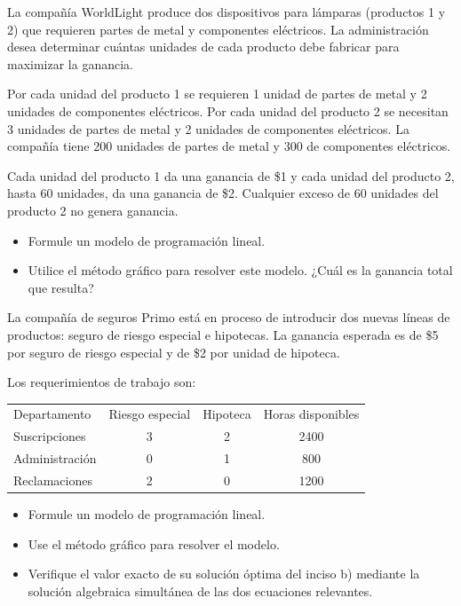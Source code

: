 \begin{Ejer} La compa\~n\'ia WorldLight produce dos dispositivos para l\'amparas (productos 1 y 2) que requieren partes de metal y componentes el\'ectricos. La administraci\'on desea determinar cu\'antas unidades de cada producto debe fabricar para maximizar la ganancia.

Por cada unidad del producto 1 se requieren 1 unidad de partes de metal y 2 unidades de componentes el\'ectricos. Por cada unidad del producto 2 se necesitan 3 unidades de partes de metal y 2 unidades de componentes el\'ectricos. La compa\~n\'ia tiene 200 unidades de partes de metal y 300 de componentes el\'ectricos.

Cada unidad del producto 1 da una ganancia de \$1 y cada unidad del producto 2, hasta 60 unidades, da una ganancia de \$2. Cualquier exceso de 60 unidades del producto 2 no genera ganancia.

\begin{itemize}
\item[a)] Formule un modelo de programaci\'on lineal.
\item[b)] Utilice el m\'etodo gr\'afico para resolver este modelo. ¿Cu\'al es la ganancia total que resulta?
\end{itemize}


\end{Ejer}


\begin{Ejer}  La compa\~n\'ia de seguros Primo est\'a en proceso de introducir dos nuevas l\'ineas de productos: seguro de riesgo especial e hipotecas. La ganancia esperada es de \$5 por seguro de riesgo especial y de \$2 por unidad de hipoteca.

Los requerimientos de trabajo son:

\begin{center}
\begin{tabular}{lccc}
Departamento & Riesgo especial & Hipoteca & Horas disponibles \\
Suscripciones & 3 & 2 & 2400 \\
Administraci\'on & 0 & 1 & 800 \\
Reclamaciones & 2 & 0 & 1200
\end{tabular}
\end{center}

\begin{itemize}
\item[a)] Formule un modelo de programaci\'on lineal.
\item[b)] Use el m\'etodo gr\'afico para resolver el modelo.
\item[c)] Verifique el valor exacto de su soluci\'on \'optima del inciso b) mediante la soluci\'on algebraica simult\'anea de las dos ecuaciones relevantes.
\end{itemize}
\end{Ejer}


